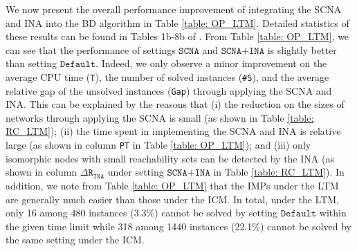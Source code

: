 \documentclass[a4paper,10pt]{article}
\theoremstyle{plain}
\newcommand{\rev}[1]{{\color{black}#1}}
\newcommand{\revv}[1]{{#1}}
\newcommand{\Default}{{\texttt{Default}}\xspace}
\newcommand{\SCNA}{{\texttt{SCNA}}\xspace}
\newcommand{\INA}{{\texttt{SCNA+INA}}}
\newcommand{\sharpS}{{\texttt{\#S}}\xspace}
\newcommand{\Time}{{\texttt{T}}\xspace}
\newcommand{\Gap}{{\texttt{Gap}}\xspace}
\newcommand{\PTime}{{\texttt{PT}}\xspace}
\newcommand{\DeltaRINA}{{\Delta\texttt{R}_\texttt{INA}}}
\begin{document}
We now present the overall performance improvement of integrating the SCNA and INA into the BD algorithm in Table \ref{table: OP_LTM}.
Detailed statistics of these results can be found in Tables 1b-8b of \cite{Chen2022}.
%
From Table \ref{table: OP_LTM}, we can see that the performance of settings $\SCNA$ and $\INA$ is slightly better than setting $\Default$.
%
\revv{Indeed, we only observe a minor improvement on the average CPU time (\Time), the number of solved instances (\sharpS), and the average relative gap of the unsolved instances (\Gap) through applying the SCNA and INA.}
%
This can be explained by the reasons that (i) the reduction on the sizes of networks through applying the SCNA is small (as shown in Table \ref{table: RC_LTM});
(ii) the time spent in implementing the SCNA and INA is relative  large (as shown in column \PTime in Table \ref{table: OP_LTM}); and
(iii) only isomorphic nodes with small reachability sets can be detected by the INA (as shown in column \revv{$\DeltaRINA$ under} setting $\INA$ in Table \ref{table: RC_LTM}).
%
In addition, we note from Table \ref{table: OP_LTM} that the IMPs under the LTM are \rev{generally} much easier than those under the ICM.
In total, under the LTM, only 16 among 480 instances (3.3\%) cannot be solved by setting $\Default$ within the given time limit
while 318 among 1440 instances (22.1\%) cannot be solved by the same setting under the ICM.
\end{document}
